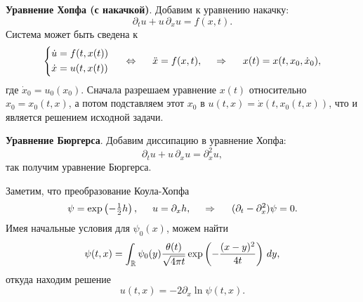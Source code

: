 \textbf{Уравнение Хопфа (с накачкой)}. Добавим к уравнению накачку:
\begin{equation*}
    \partial_t u + u\, \partial_x u = f(x, t).
\end{equation*}
Система может быть сведена к
\begin{equation*}
    \left\{\begin{aligned}
        \dot{u} &= f(t, x(t)) \\
        \dot{x} &= u(t, x(t))
    \end{aligned}\right.
    \hspace{5 mm} \Leftrightarrow \hspace{5 mm} 
    \ddot{x} = f(x, t),
    \hspace{0.5cm} \Rightarrow \hspace{0.5cm}
    x(t) = x(t, x_0, \dot{x}_0),
\end{equation*}
где $\dot{x}_0 = u_0(x_0)$. Сначала разрешаем уравнение $x(t)$ относительно $x_0 = x_0(t, x)$, а потом подставляем этот $x_0$ в $u(t, x) = \dot{x}(t, x_0(t,x))$, что и является решением исходной задачи.



\textbf{Уравнение Бюргерса}. Добавим диссипацию в уравнение Хопфа:
\begin{equation*}
    \partial_t u + u\, \partial_x u = \partial_x^2 u,
\end{equation*}
так получим уравнение Бюргерса.

Заметим, что преобразование Коула-Хопфа
\begin{equation*}
    \psi = \exp\left(- \tfrac{1}{2}h\right),
    \hspace{5 mm} 
    u = \partial_x h,
    \hspace{0.5cm} \Rightarrow \hspace{0.5cm}
    (\partial_t - \partial_x^2)\psi = 0.
\end{equation*}
Имея начальные условия для $\psi_0(x)$, можем найти
\begin{equation*}
    \psi(t, x) = \int_{\mathbb{R}} \psi_0 (y) \frac{\theta(t)}{\sqrt{4 \pi t}} \exp\left(-\frac{(x-y)^2}{4t}\right) \, d y,
\end{equation*}
откуда находим решение
\begin{equation*}
    u(t, x) =  -2 \partial_x \ln \psi(t, x).
\end{equation*}

